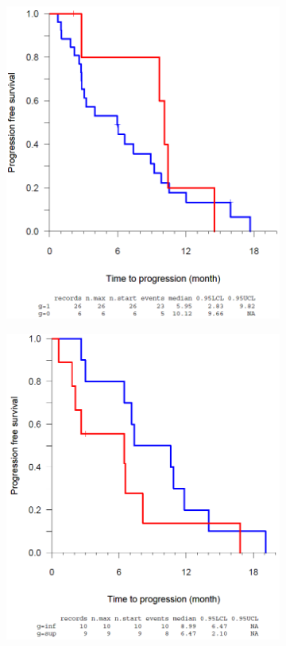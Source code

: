 \begin{figure}[htbp]
\begin{subfigure}[b]{0.33\linewidth}
    \includegraphics[width=0.95\linewidth]{figures/raster/FIG_27b} 
  \end{subfigure} 
 \begin{subfigure}[b]{0.33\linewidth}
    \centering
    \includegraphics[width=0.95\linewidth]{figures/raster/FIG_27c} 

\end{subfigure}
\end{figure}
